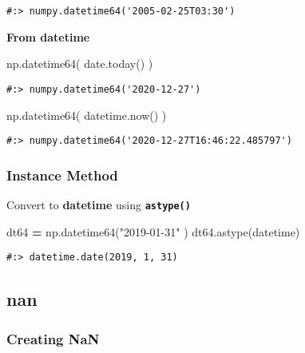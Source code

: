 \documentclass[
]{book}
\newenvironment{Shaded}{\begin{snugshade}}{\end{snugshade}}
\newcommand{\NormalTok}[1]{#1}
\newcommand{\OperatorTok}[1]{\textcolor[rgb]{0.43,0.43,0.43}{\textbf{#1}}}
\newcommand{\StringTok}[1]{\textcolor[rgb]{0.5,0.5,0.5}{#1}}
\begin{document}
\begin{verbatim}
#:> numpy.datetime64('2005-02-25T03:30')
\end{verbatim}

\textbf{From datetime}

\begin{Shaded}
\begin{Highlighting}[]
\NormalTok{np.datetime64( date.today() )}
\end{Highlighting}
\end{Shaded}

\begin{verbatim}
#:> numpy.datetime64('2020-12-27')
\end{verbatim}

\begin{Shaded}
\begin{Highlighting}[]
\NormalTok{np.datetime64( datetime.now() )}
\end{Highlighting}
\end{Shaded}

\begin{verbatim}
#:> numpy.datetime64('2020-12-27T16:46:22.485797')
\end{verbatim}

\hypertarget{instance-method-2}{%
\subsubsection{Instance Method}\label{instance-method-2}}

Convert to \textbf{datetime} using \textbf{\texttt{astype()}}

\begin{Shaded}
\begin{Highlighting}[]
\NormalTok{dt64 }\OperatorTok{=}\NormalTok{ np.datetime64(}\StringTok{"2019{-}01{-}31"}\NormalTok{ )}
\NormalTok{dt64.astype(datetime)}
\end{Highlighting}
\end{Shaded}

\begin{verbatim}
#:> datetime.date(2019, 1, 31)
\end{verbatim}

\hypertarget{nan}{%
\subsection{nan}\label{nan}}

\hypertarget{creating-nan}{%
\subsubsection{Creating NaN}\label{creating-nan}}
\end{document}
